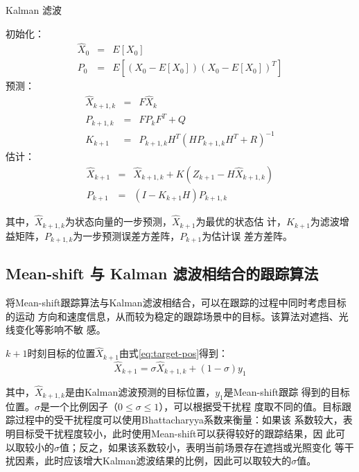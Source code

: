\begin{algorithm}[htbp]
  \caption{Kalman 滤波}
  \label{alg:kalman}
  \begin{algorithmic}[1]
    \STATE 初始化：
    \begin{eqnarray*}
      \hat{X}_0&=&E[X_0]\\
      P_0&=&E[(X_0-E[X_0])(X_0-E[X_0])^{T}]
    \end{eqnarray*}
    \STATE 预测：
    \begin{eqnarray*}
      \hat{X}_{k+1,k}&=&F \hat{X}_{k}\\ 
      P_{k+1,k}&=&F P_{k}F^{T}+Q\\
      K_{k+1}&=&P_{k+1,k}H^{T}(H P_{k+1,k}H^{T}+R)^{-1}
    \end{eqnarray*}
    \STATE 估计：
    \begin{eqnarray*}
      \hat{X}_{k+1}&=&\hat{X}_{k+1,k}+K(Z_{k+1}-H\hat{X}_{k+1,k})\\
      P_{k+1}&=&(I-K_{k+1}H)P_{k+1,k}
    \end{eqnarray*}
  \end{algorithmic}
\end{algorithm}

其中，$\hat{X}_{k+1, k}$为状态向量的一步预测，$\hat{X}_{k+1}$为最优的状态估
计，$K_{k+1}$为滤波增益矩阵，$P_{k+1, k}$为一步预测误差方差阵，$P_{k+1}$为估计误
差方差阵。

\subsection{Mean-shift 与 Kalman 滤波相结合的跟踪算法}
\label{sec:combine}

将Mean-shift跟踪算法与Kalman滤波相结合，可以在跟踪的过程中同时考虑目标的运动
方向和速度信息，从而较为稳定的跟踪场景中的目标。该算法对遮挡、光线变化等影响不敏
感。

$k+1$时刻目标的位置$\hat{X}_{k+1}$由式\ref{eq:target-pos}得到：
\begin{equation}
  \label{eq:target-pos}
  \hat{X}_{k+1}=\sigma \hat{X}_{k+1,k}+(1-\sigma)y_1
\end{equation}

其中，$\hat{X}_{k+1,k}$是由Kalman滤波预测的目标位置，$y_1$是Mean-shift跟踪
得到的目标位置。$\sigma$是一个比例因子（$0 \le \sigma \le 1$），可以根据受干扰程
度取不同的值。目标跟踪过程中的受干扰程度可以使用Bhattacharyya系数来衡量：如果该
系数较大，表明目标受干扰程度较小，此时使用Mean-shift可以获得较好的跟踪结果，因
此可以取较小的$\sigma$值；反之，如果该系数较小，表明当前场景存在遮挡或光照变化
等干扰因素，此时应该增大Kalman滤波结果的比例，因此可以取较大的$\sigma$值。

